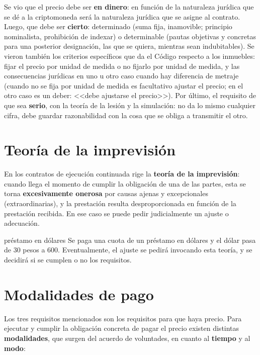 \documentclass[12pt,oneside]{book}
\begin{document}
Se vio que el precio debe ser \textbf{en dinero}: en funci\'on de la naturaleza jur\'idica que se d\'e a la criptomoneda ser\'a la naturaleza jur\'idica que se asigne al contrato. Luego, que debe ser \textbf{cierto}: determinado (suma fija, inamovible; principio nominalista, prohibici\'on de indexar) o determinable (pautas objetivas y concretas para una posterior designaci\'on, las que se quiera, mientras sean indubitables). Se vieron tambi\'en los criterios espec\'ificos que da el C\'odigo respecto a los inmuebles: fijar el precio por unidad de medida o no fijarlo por unidad de medida, y las consecuencias jur\'idicas en uno u otro caso cuando hay diferencia de metraje (cuando no se fija por unidad de medida es facultativo ajustar el precio; en el otro caso es un deber: <<debe ajustarse el precio>>). Por \'ultimo, el requisito de que sea \textbf{serio}, con la teor\'ia de la lesi\'on y la simulaci\'on: no da lo mismo cualquier cifra, debe guardar razonabilidad con la cosa que se obliga a transmitir el otro.

\section{Teor\'ia de la imprevisi\'on}

En los contratos de ejecuci\'on continuada rige la \textbf{teor\'ia de la imprevisi\'on}: cuando llega el momento de cumplir la obligaci\'on de una de las partes, esta se torna \textbf{excesivamente onerosa} por causas ajenas y excepcionales (extraordinarias), y la prestaci\'on resulta desproporcionada en funci\'on de la prestaci\'on recibida. En ese caso se puede pedir judicialmente un ajuste o adecuaci\'on.

\begin{example}{pr\'estamo en d\'olares}
Se paga una cuota de un pr\'estamo en d\'olares y el d\'olar pasa de 30 pesos a 600. Eventualmente, el ajuste se pedir\'a invocando esta teor\'ia, y se decidir\'a si se cumplen o no los requisitos.
\end{example}

\section{Modalidades de pago}

Los tres requisitos mencionados son los requisitos para que haya precio. Para ejecutar y cumplir la obligaci\'on concreta de pagar el precio existen distintas \textbf{modalidades}, que surgen del acuerdo de voluntades, en cuanto al \textbf{tiempo} y al \textbf{modo}:
\end{document}
